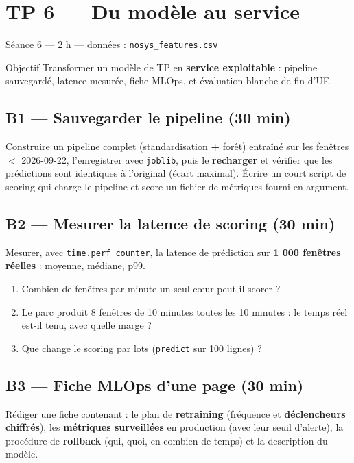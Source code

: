 \documentclass[11pt,a4paper]{article}
\newcommand{\py}[1]{\texttt{\small #1}}
\newcommand{\file}[1]{\texttt{\small #1}}
\begin{document}
\newpage
\section*{TP 6 --- Du modèle au service}
{\small\color{grisdoux}Séance 6 --- 2 h --- données : \file{nosys\_features.csv}}

\begin{obj}{Objectif}
Transformer un modèle de TP en \textbf{service exploitable} : pipeline
sauvegardé, latence mesurée, fiche MLOps, et évaluation blanche de fin d'UE.
\end{obj}

\subsection*{B1 --- Sauvegarder le pipeline (30 min)}
Construire un pipeline complet (standardisation \textbf{+} forêt) entraîné sur
les fenêtres $<$ 2026-09-22, l'enregistrer avec \py{joblib}, puis le
\textbf{recharger} et vérifier que les prédictions sont identiques à
l'original (écart maximal).
Écrire un court script de scoring qui charge le pipeline et score un fichier
de métriques fourni en argument.

\subsection*{B2 --- Mesurer la latence de scoring (30 min)}
Mesurer, avec \py{time.perf\_counter}, la latence de prédiction sur
\textbf{1 000 fenêtres réelles} : moyenne, médiane, p99.
\begin{enumerate}
\item Combien de fenêtres par minute un seul cœur peut-il scorer ?
\item Le parc produit 8 fenêtres de 10 minutes toutes les 10 minutes :
le temps réel est-il tenu, avec quelle marge ?
\item Que change le scoring par lots (\py{predict} sur 100 lignes) ?
\end{enumerate}

\subsection*{B3 --- Fiche MLOps d'une page (30 min)}
Rédiger une fiche contenant : le plan de \textbf{retraining} (fréquence et
\textbf{déclencheurs chiffrés}), les \textbf{métriques surveillées} en
production (avec leur seuil d'alerte), la procédure de \textbf{rollback}
(qui, quoi, en combien de temps) et la description du modèle.
\end{document}
